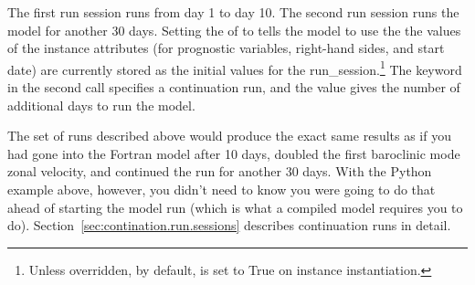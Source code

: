 \begin{htmlonly}
\label{fig:continuation.example}
\begin{center}

\end{center}
\end{htmlonly}


The first run session runs from day 1 to day 10.  The second
run session runs the model for another 30 days.  
Setting the  of
 to  tells the model to use the
the values of the instance attributes 
(for prognostic variables, right-hand sides, and start date) 
are currently stored 
as the initial values for the run\_session.\footnote%
	{Unless overridden, by default, 
	 is set
	to True on  instance instantiation.}
The 
keyword in the second  call specifies a
continuation run, and the value gives the number of additional
days to run the model.

The set of runs described above would produce the exact same
results as if you had gone into the Fortran model after 10 days,
doubled the first baroclinic mode zonal velocity, and continued
the run for another 30 days.  With the Python example above, however,
you didn't need to know you were going to do that ahead of starting
the model run (which is what a compiled model requires you to do).
Section~\ref{sec:contination.run.sessions} describes continuation
runs in detail.


